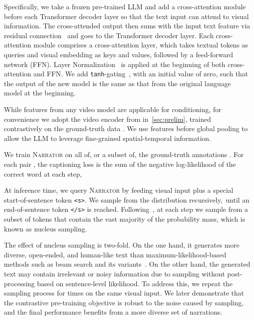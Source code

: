 \documentclass[10pt,twocolumn,letterpaper]{article}
\newcommand{\myparagraph}[1]{\vspace{0pt}\noindent{\bf #1}}
\newcommand{\narrator}{\textsc{Narrator}\xspace}
\begin{document}
Specifically, we take a frozen pre-trained LLM and add a cross-attention module before each Transformer decoder layer so that the text input can attend to visual information.
The cross-attended output then sums with the input text feature via residual connection~\cite{he2016resnet} and goes to the Transformer decoder layer.
Each cross-attention module comprises a cross-attention layer,
which takes textual tokens as queries and visual embedding as keys and values, followed by a feed-forward network (FFN).
Layer Normalization~\cite{ba2016layernorm} is applied at the beginning of both cross-attention and FFN.
We add {\tt tanh}-gating~\cite{hochreiter1997lstm}, with an initial value of zero, such that the output of the new model is the same as that from the original language model at the beginning.

While features from any video model are applicable for conditioning, for convenience we adopt the video encoder from  in~\cref{sec:prelim}, trained
contrastively on the ground-truth data . We use features before global pooling to allow the LLM to leverage fine-grained spatial-temporal information.


\myparagraph{Training.}
We train \narrator on all of, or a subset of, the ground-truth annotations .
For each pair , the captioning loss is the sum of the negative log-likelihood of the correct word at each step,
{\small

}




\myparagraph{Inference.}
At inference time, we query \narrator by feeding visual input  plus a special start-of-sentence token \texttt{<s>}. We sample from the distribution recursively,~\ie  until an end-of-sentence token \texttt{</s>} is reached.
Following~\cite{holtzman2020curious},
at each step we sample from a subset of tokens that contain the vast majority of the probability mass, which is known as nucleus sampling.

The effect of nucleus sampling is two-fold.
On the one hand, it generates more diverse, open-ended, and human-like text than maximum-likelihood-based methods such as beam search and its variants~\cite{vijayakumar2016diverse}.
On the other hand, the generated text may contain irrelevant or noisy information due to sampling without post-processing based on sentence-level likelihood.
To address this, we repeat the sampling process for  times on the same visual input.
We later demonstrate that the contrastive pre-training objective is robust to the noise caused by sampling, and the final performance benefits from a more diverse set of narrations. 
\end{document}
